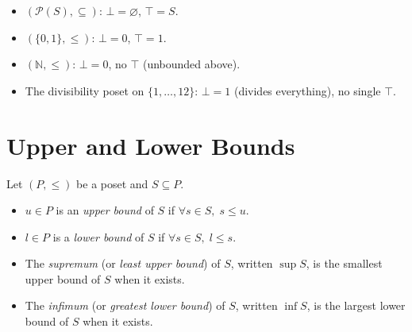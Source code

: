 \documentclass[12pt, a4paper, openright]{book}
\theoremstyle{thmstyle}
\theoremstyle{defstyle}
\newenvironment{defbox}[1][]{%
  \begin{tcolorbox}[defbox, title={Definition\ifx\\#1\\\else\ --- #1\fi}]%
}{\end{tcolorbox}}
\newenvironment{exbox}[1][]{%
  \begin{tcolorbox}[exbox, title={Example\ifx\\#1\\\else\ --- #1\fi}]%
}{\end{tcolorbox}}
\begin{document}
\begin{exbox}[Bounded orders]
  \begin{itemize}[nosep]
    \item $(\mathcal{P}(S), \subseteq)$: $\bot = \varnothing$, $\top = S$.
    \item $(\{0,1\}, \leq)$: $\bot = 0$, $\top = 1$.
    \item $(\mathbb{N}, \leq)$: $\bot = 0$, no $\top$ (unbounded above).
    \item The divisibility poset on $\{1,\ldots,12\}$: $\bot = 1$ (divides everything), no single $\top$.
  \end{itemize}
\end{exbox}

\section{Upper and Lower Bounds}

\begin{defbox}[Bounds]
  Let $(P, \leq)$ be a poset and $S \subseteq P$.
  \begin{itemize}[nosep]
    \item $u \in P$ is an \emph{upper bound} of $S$ if $\forall s \in S,\; s \leq u$.
    \item $l \in P$ is a \emph{lower bound} of $S$ if $\forall s \in S,\; l \leq s$.
    \item The \emph{supremum} (or \emph{least upper bound}) of $S$, written $\sup S$, is the
          smallest upper bound of $S$ when it exists.
    \item The \emph{infimum} (or \emph{greatest lower bound}) of $S$, written $\inf S$, is the
          largest lower bound of $S$ when it exists.
  \end{itemize}
\end{defbox}
\end{document}

